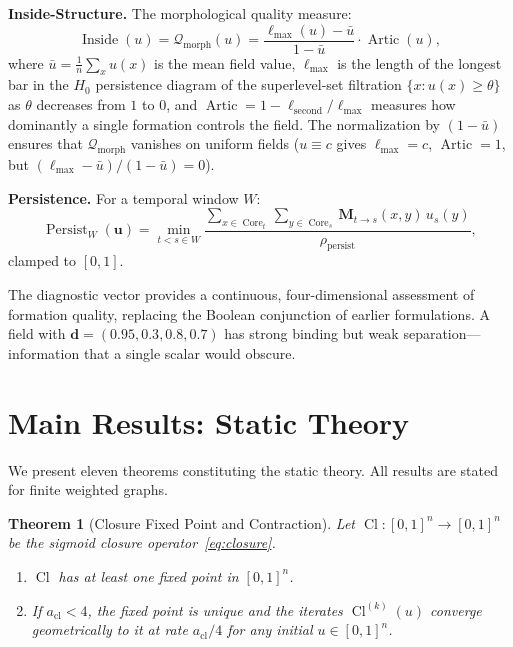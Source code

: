 \documentclass[lettersize,journal]{IEEEtran}
\newtheorem{theorem}{Theorem}
\DeclareMathOperator{\Cl}{Cl}
\DeclareMathOperator{\Core}{Core}
\DeclareMathOperator{\Inside}{Inside}
\DeclareMathOperator{\Persist}{Persist}
\DeclareMathOperator{\Artic}{Artic}
\begin{document}
\textbf{Inside-Structure.} The morphological quality measure:
\begin{equation}
\Inside(u) = \mathcal{Q}_{\mathrm{morph}}(u) = \frac{\ell_{\max}(u) - \bar{u}}{1 - \bar{u}} \cdot \Artic(u),
\end{equation}
where $\bar{u} = \frac{1}{n}\sum_x u(x)$ is the mean field value, $\ell_{\max}$ is the length of the longest bar in the $H_0$ persistence diagram of the superlevel-set filtration $\{x : u(x) \geq \theta\}$ as $\theta$ decreases from $1$ to $0$, and $\Artic = 1 - \ell_{\mathrm{second}}/\ell_{\max}$ measures how dominantly a single formation controls the field. The normalization by $(1 - \bar{u})$ ensures that $\mathcal{Q}_{\mathrm{morph}}$ vanishes on uniform fields ($u \equiv c$ gives $\ell_{\max} = c$, $\Artic = 1$, but $(\ell_{\max} - \bar{u})/(1-\bar{u}) = 0$).

\textbf{Persistence.} For a temporal window $W$:
\begin{equation}
\Persist_W(\mathbf{u}) = \min_{t < s \in W} \frac{\sum_{x \in \Core_t} \sum_{y \in \Core_s} \mathbf{M}_{t\to s}(x,y)\,u_s(y)}{\rho_{\mathrm{persist}}},
\end{equation}
clamped to $[0,1]$.

The diagnostic vector provides a continuous, four-dimensional assessment of formation quality, replacing the Boolean conjunction of earlier formulations. A field with $\mathbf{d} = (0.95, 0.3, 0.8, 0.7)$ has strong binding but weak separation---information that a single scalar would obscure.

\section{Main Results: Static Theory}
\label{sec:static}

We present eleven theorems constituting the static theory. All results are stated for finite weighted graphs.

\begin{theorem}[Closure Fixed Point and Contraction]
\label{thm:closure-contraction}
Let $\Cl : [0,1]^n \to [0,1]^n$ be the sigmoid closure operator~\eqref{eq:closure}.
\begin{enumerate}
\item[(a)] $\Cl$ has at least one fixed point in $[0,1]^n$.
\item[(b)] If $a_{\mathrm{cl}} < 4$, the fixed point is unique and the iterates $\Cl^{(k)}(u)$ converge geometrically to it at rate $a_{\mathrm{cl}}/4$ for any initial $u \in [0,1]^n$.
\end{enumerate}
\end{theorem}
\end{document}
